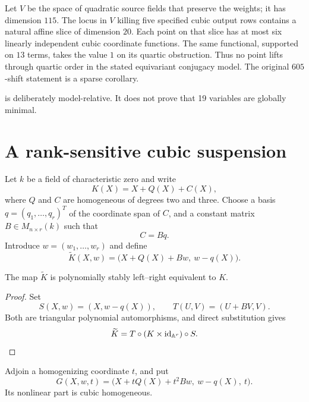 \documentclass[11pt,reqno]{amsart}
\begin{document}
\begin{theorem}
\label{thm:intro-obstruction}
Let \(V\) be the space of quadratic source fields that preserve the weights;
it has dimension \(115\).  The locus in \(V\) killing five specified cubic
output rows contains a natural affine slice of dimension \(20\).  Each point
on that slice has at most six linearly independent cubic coordinate
functions.  The same functional, supported on \(13\) terms, takes the value
\(1\) on its quartic obstruction.  Thus no point lifts through quartic order
in the stated equivariant conjugacy model.  The original \(605\)-shift
statement is a sparse corollary.
\end{theorem}

 is deliberately model-relative.  It does not
prove that 19 variables are globally minimal.

\section{A rank-sensitive cubic suspension}
\label{sec:suspension}

Let \(k\) be a field of characteristic zero and write
\[
K(X)=X+Q(X)+C(X),
\]
where \(Q\) and \(C\) are homogeneous of degrees two and three.  Choose a
basis \(q=(q_1,\ldots,q_r)^T\) of the coordinate span of \(C\), and a
constant matrix \(B\in M_{n\times r}(k)\) such that
\[
C=Bq.
\]
Introduce \(w=(w_1,\ldots,w_r)\) and define
\begin{equation}
\label{eq:stable-map}
\widetilde K(X,w)=
\bigl(X+Q(X)+Bw,\ w-q(X)\bigr).
\end{equation}

\begin{lemma}
\label{lem:stable-identity}
The map \(\widetilde K\) is polynomially stably left--right equivalent to
\(K\).
\end{lemma}

\begin{proof}
Set
\[
S(X,w)=(X,w-q(X)),\qquad
T(U,V)=(U+BV,V).
\]
Both are triangular polynomial automorphisms, and direct substitution gives
\[
\widetilde K=T\circ(K\times\operatorname{id}_{\mathbb A^r})\circ S.
\]
\end{proof}

Adjoin a homogenizing coordinate \(t\), and put
\begin{equation}
\label{eq:homogeneous-suspension}
G(X,w,t)=
\bigl(
X+tQ(X)+t^2Bw,\ w-q(X),\ t
\bigr).
\end{equation}
Its nonlinear part is cubic homogeneous.
\end{document}
